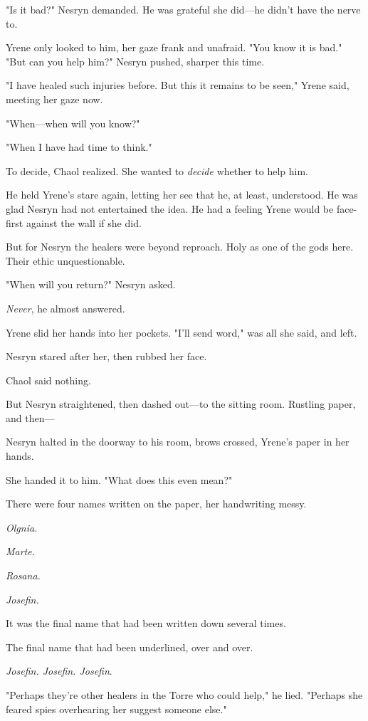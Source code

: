 "Is it bad?" Nesryn demanded. He was grateful she did---he didn't have the nerve to.

Yrene only looked to him, her gaze frank and unafraid. "You know it is bad." "But can you help him?" Nesryn pushed, sharper this time.

"I have healed such injuries before. But this  it remains to be seen," Yrene said, meeting her gaze now.

"When---when will you know?"

"When I have had time to think."

To decide, Chaol realized. She wanted to \emph{decide} whether to help him.

He held Yrene's stare again, letting her see that he, at least, understood. He was glad Nesryn had not entertained the idea. He had a feeling Yrene would be face-first against the wall if she did.

But for Nesryn  the healers were beyond reproach. Holy as one of the gods here. Their ethic unquestionable.

"When will you return?" Nesryn asked.

\emph{Never}, he almost answered.

Yrene slid her hands into her pockets. "I'll send word," was all she said, and left.

Nesryn stared after her, then rubbed her face.

Chaol said nothing.

But Nesryn straightened, then dashed out---to the sitting room. Rustling paper, and then---

Nesryn halted in the doorway to his room, brows crossed, Yrene's paper in her hands.

She handed it to him. "What does this even mean?"

There were four names written on the paper, her handwriting messy.

\emph{Olgnia.}

\emph{Marte.}

\emph{Rosana.}

\emph{Josefin.}

It was the final name that had been written down several times.

The final name that had been underlined, over and over.

\emph{Josefin. Josefin. Josefin}.

"Perhaps they're other healers in the Torre who could help," he lied. "Perhaps she feared spies overhearing her suggest someone else."

